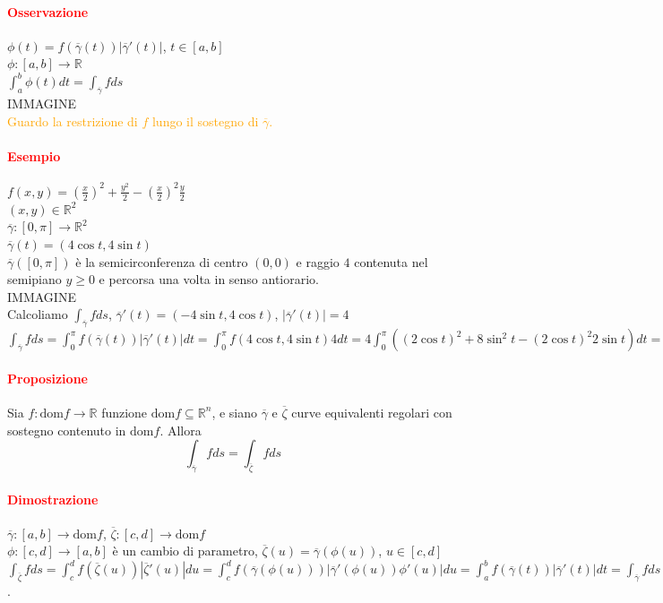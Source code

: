 \documentclass{article}
\newcommand{\R}{\mathbb{R}}
\newcommand{\dom}{\text{dom}}
\begin{document}
\paragraph{\textcolor{red}{Osservazione}}
$\phi(t)=f(\overline{\gamma}(t))|\overline{\gamma}'(t)|$, $t\in[a,b]$\\
$\phi: [a,b]\rightarrow \R$\\
$\int_a^b \phi(t)dt=\int_{\overline{\gamma}}f ds$\\
IMMAGINE\\
\textcolor{orange}{Guardo la restrizione di $f$ lungo il sostegno di $\overline{\gamma}$.}

\paragraph{\textcolor{red}{Esempio}}
$f(x,y)=\left( \frac{x}{2} \right)^2+\frac{y^2}{2}-\left( \frac{x}{2} \right)^2\frac{y}{2}$\\
$(x,y)\in \R^2$\\
$\overline{\gamma}:[0,\pi]\rightarrow \R^2$\\
$\overline{\gamma}(t)=(4\cos t, 4 \sin t)$\\
$\overline{\gamma}([0,\pi])$ è la semicirconferenza di centro $(0,0)$ e raggio $4$ contenuta nel semipiano $y \geq 0$ e percorsa una volta in senso antiorario.\\
IMMAGINE\\
Calcoliamo $\int_{\overline{\gamma}}f ds$, $\overline{\gamma}'(t)=(-4\sin t, 4 \cos t)$, $|\overline{\gamma}'(t)|=4$\\
$\int_{\overline{\gamma}}fds =\int_0^\pi f(\overline{\gamma}(t))|\overline{\gamma}'(t)|dt=\int_0^\pi f(4\cos t , 4 \sin t)4 dt=4\int_0^\pi ((2\cos t)^2+8\sin^2 t-(2\cos t)^2 2\sin t)dt= 4 \int_0^\pi (4+4\sin^2 t -8 \cos^2 t \sin t) dt =...$

\paragraph{\textcolor{red}{Proposizione}}
Sia $f: \dom f \rightarrow \R$ funzione $\dom f \subseteq \R^n$, e siano $\overline{\gamma}$ e $\overline{\zeta}$ curve equivalenti regolari con sostegno contenuto in $\dom f$. Allora
\begin{equation*}
    \int_{\overline{\gamma}}f ds = \int_{\overline{\zeta}}f ds
\end{equation*}

\paragraph{\textcolor{red}{Dimostrazione}}
$\overline{\gamma}:[a,b]\rightarrow \dom f$, $\overline{\zeta}:[c,d]\rightarrow \dom f$\\
$\phi: [c,d]\rightarrow [a,b]$ è un cambio di parametro, $\overline{\zeta}(u)=\overline{\gamma}(\phi(u))$, $u\in [c,d]$\\
$\int_{\overline{\zeta}}f ds = \int_c^d f(\overline{\zeta}(u))|\overline{\zeta}'(u)|du= \int_c^d f(\overline{\gamma}(\phi(u)))|\overline{\gamma}'(\phi(u))\phi'(u)|du=\int_a^b f(\overline{\gamma}(t))|\overline{\gamma}'(t)|dt=\int_{\overline{\gamma}} f ds$.
\end{document}

